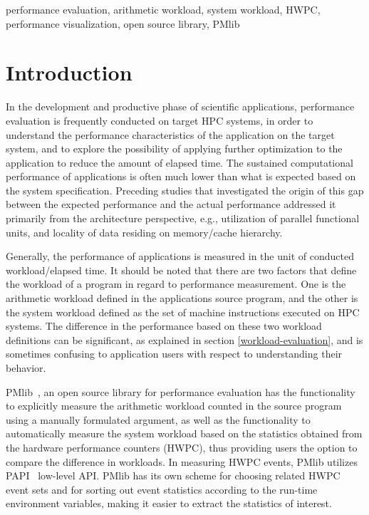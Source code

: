 \documentclass[conference]{IEEEtran}
\begin{document}
\begin{IEEEkeywords}
performance evaluation,
arithmetic workload,
system workload,
HWPC,
performance visualization,
open source library,
PMlib
\end{IEEEkeywords}

\section{Introduction}
In the development and productive phase of scientific applications,
performance evaluation is frequently conducted on target HPC systems,
in order to understand the performance characteristics
of the application on the target system, and to explore the possibility of
applying further optimization to the application to reduce the amount of
elapsed time.
The sustained computational performance of applications is often much
lower than what is expected based on the system specification.
Preceding studies that investigated the origin of this gap between
the expected performance and the actual performance addressed it
primarily from the architecture perspective, e.g., 
utilization of parallel functional units,
and locality of data residing on memory/cache hierarchy.

Generally, the performance of applications is measured in the unit of
conducted workload/elapsed time.
It should be noted that there are two factors that define the workload
of a program in regard to performance measurement. 
One is the arithmetic workload defined in the applications source program,
and the other is the system workload defined as the set of
machine instructions executed on HPC systems.
The difference in the performance based on these two workload definitions
can be significant, as explained in section \ref{workload-evaluation},
and is sometimes confusing to application users with respect to
understanding their behavior.

PMlib~\cite{PMlib:webpage-public}, an open source library for performance
evaluation has the functionality
to explicitly measure the arithmetic workload counted in the source program
using a manually formulated argument, as well as the functionality
to automatically measure the system workload based on the statistics
obtained from the hardware performance counters (HWPC),
thus providing users the option to compare the difference in workloads.
In measuring HWPC events, PMlib utilizes PAPI~\cite{PAPI:5.6} low-level API.
PMlib has its own scheme for choosing related HWPC event sets and for sorting
out event statistics according to the run-time environment variables, making it
easier to extract the statistics of interest.
\end{document}
